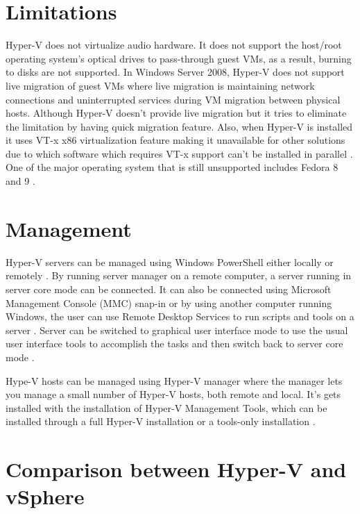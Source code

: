 \documentclass[9pt,twocolumn,twoside]{../../styles/osajnl}
\begin{document}
\section{Limitations}

Hyper-V does not virtualize audio hardware. It does not support the
host/root operating system's optical drives to pass-through guest VMs,
as a result, burning to disks are not supported. In Windows Server
2008, Hyper-V does not support live migration of guest VMs where live
migration is maintaining network connections and uninterrupted
services during VM migration between physical hosts. Although Hyper-V
doesn't provide live migration but it tries to eliminate the
limitation by having quick migration feature. Also, when Hyper-V is
installed it uses VT-x x86 virtualization feature making it
unavailable for other solutions due to which software which requires
VT-x support can't be installed in parallel
\cite{www-hyperv-wikipedia}. One of the major operating system that is
still unsupported includes Fedora 8 and 9 \cite{www-hyperv-wikipedia}.

\section{Management}

Hyper-V servers can be managed using Windows PowerShell either locally
or remotely \cite{www-microsoft-technet}. By running server manager on
a remote computer, a server running in server core mode can be
connected. It can also be connected using Microsoft Management Console
(MMC) snap-in or by using another computer running Windows, the user
can use Remote Desktop Services to run scripts and tools on a server
\cite{www-microsoft-technet}. Server can be switched to graphical user
interface mode to use the usual user interface tools to accomplish the
tasks and then switch back to server core mode
\cite{www-microsoft-technet}.

Hype-V hosts can be managed using Hyper-V manager where the manager
lets you manage a small number of Hyper-V hosts, both remote and
local. It's gets installed with the installation of Hyper-V Management
Tools, which can be installed through a full Hyper-V installation or a
tools-only installation \cite{www-microsoft-technet}.

\section{Comparison between Hyper-V and vSphere}
\end{document}
